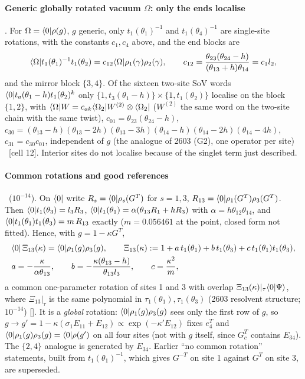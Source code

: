 \paragraph{Generic globally rotated vacuum $\Omega$: only the ends localise} \ex. For $\Omega=\langle0|\rho(g)$, $g$ generic, only $t_1(\theta_1)^{-1}$ and
$t_1(\theta_4)^{-1}$ are single-site rotations, with the constants $c_1,c_4$ above, and the end blocks are
\begin{equation}
 \langle\Omega| t_1(\theta_1)^{-1}t_1(\theta_2)=c_{12}\langle\Omega|\rho_1(\gamma)\rho_2(\gamma),\qquad
 c_{12}=\frac{\theta_{23}(\theta_{24}-h)}{(\theta_{13}+h)\theta_{14}}=c_1l_2,
\end{equation}
and the mirror block $\{3,4\}$. Of the sixteen two-site SoV words $\langle0|t_a(\theta_1-h)t_1(\theta_2)^k$ only
$\{1,t_3(\theta_1-h)\}\times\{1,t_1(\theta_2)\}$ localise on the block $\{1,2\}$, with
$\langle\Omega| W=c_{ak}\langle\Omega_2|W^{(2)}\otimes\langle\Omega_2|$ ($W^{(2)}$ the same word on the two-site chain with the same twist),
$c_{01}=\theta_{23}(\theta_{24}-h)$, $c_{30}=(\theta_{13}-h)(\theta_{13}-2h)(\theta_{13}-3h)(\theta_{14}-h)(\theta_{14}-2h)(\theta_{14}-4h)$,
$c_{31}=c_{30}c_{01}$, independent of $g$ (the analogue of 2603 (G2), one operator per site) \ex\ [cell 12]. Interior sites do not localise
because of the singlet term just described.

\paragraph{Common rotations and good references} \npy\ ($10^{-14}$). On $\langle0|$ write $R_s=\langle0|\rho_s(G^T)$ for $s=1,3$, $R_{13}=\langle0|\rho_1(G^T)\rho_3(G^T)$. Then
$\langle0|t_1(\theta_3)=l_3R_3$, $\langle0|t_1(\theta_1)=\alpha(\theta_{13}R_1+hR_3)$ with $\alpha=h\theta_{12}\theta_{14}$, and
$\langle0|t_1(\theta_1)t_1(\theta_3)=m\,R_{13}$ exactly ($m=0.056461$ at the point, closed form not fitted). Hence, with $g=1-\kappa G^T$,
\begin{align}
 &\langle0|\,\Xi_{13}(\kappa)=\langle0|\rho_1(g)\rho_3(g),\qquad \Xi_{13}(\kappa):=1+a\,t_1(\theta_1)+b\,t_1(\theta_3)+c\,t_1(\theta_1)t_1(\theta_3),\nonumber\\
 &a=-\frac{\kappa}{\alpha\theta_{13}},\qquad b=-\frac{\kappa(\theta_{13}-h)}{\theta_{13}l_3},\qquad c=\frac{\kappa^2}{m},
\end{align}
a common one-parameter rotation of sites 1 and 3 with overlap $\Xi_{13}(\kappa)|_\tau\langle0|\Psi\rangle$, where $\Xi_{13}|_\tau$ is the same polynomial in $\tau_1(\theta_1),\tau_1(\theta_3)$
(2603 resolvent structure; $10^{-14}$) []. It is a \emph{global} rotation: $\langle0|\rho_1(g)\rho_3(g)$ sees only the first row of $g$,
so $g\to g'=1-\kappa(\sigma_1E_{11}+E_{12})\propto\exp(-\kappa'E_{12})$ fixes $e_4^T$ and $\langle0|\rho_1(g)\rho_3(g)=\langle0|\rho(g')$ on all four sites (not with $g$ itself, since $G_c^T$
contains $E_{34}$). The $\{2,4\}$ analogue is generated by $E_{34}$. Earlier ``no common rotation'' statements, built from $t_1(\theta_1)^{-1}$,
which gives $G^{-T}$ on site 1 against $G^T$ on site 3, are superseded.


